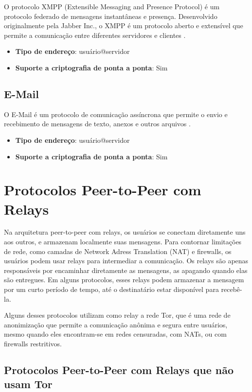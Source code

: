 O protocolo XMPP (Extensible Messaging and Presence Protocol) é um protocolo federado de mensagens instantâneas e presença. Desenvolvido originalmente pela Jabber Inc., o XMPP é um protocolo aberto e extensível que permite a comunicação entre diferentes servidores e clientes \cite{xmppspec}.

\begin{itemize}
  \item \textbf{Tipo de endereço}: usuário@servidor
  \item \textbf{Suporte a criptografia de ponta a ponta}: Sim
\end{itemize}

\subsection{E-Mail}

O E-Mail é um protocolo de comunicação assíncrona que permite o envio e recebimento de mensagens de texto, anexos e outros arquivos \cite{rfc5321}.

\begin{itemize}
  \item \textbf{Tipo de endereço}: usuário@servidor
  \item \textbf{Suporte a criptografia de ponta a ponta}: Sim
\end{itemize}

\section{Protocolos Peer-to-Peer com Relays}

Na arquitetura peer-to-peer com relays, os usuários se conectam diretamente uns aos outros, e armazenam localmente suas mensagens. Para contornar limitações de rede, como camadas de Network Adress Translation (NAT) e firewalls, os usuários podem usar relays para intermediar a comunicação. Os relays são apenas responsáveis por encaminhar diretamente as mensagens, as apagando quando elas são entregues. Em alguns protocolos, esses relays podem armazenar a mensagem por um curto período de tempo, até o destinatário estar disponível para recebê-la.

Alguns desses protocolos utilizam como relay a rede Tor, que é uma rede de anonimização que permite a comunicação anônima e segura entre usuários, mesmo quando eles encontram-se em redes censuradas, com NATs, ou com firewalls restritivos.

\subsection{Protocolos Peer-to-Peer com Relays que não usam Tor}

